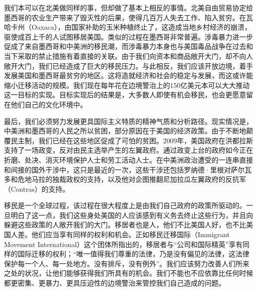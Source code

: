 \documentclass[fontset=fandol, a4paper, 12pt, openright]{ctexbook}
\begin{document}
我们本可以在北美做同样的事，但却做了基本上相反的事情。北美自由贸易协定给墨西哥的农业生产带来了毁灭性的后果，使得几百万人失去工作、陷入贫穷。在瓦哈卡州（Oaxaca），由国家补助的玉米种植终止了，这造成当地乡村经济的崩溃，驱使成百上千的人试图移居美国。类似的过程在墨西哥非常普遍。涉毒暴力进一步促成了来自墨西哥和中美洲的移民潮，而涉毒暴力本身也与美国毒品战争在过去和当下采取的禁止措施有着直接的关联。由于我们向资本和商品敞开大门，却不向人敞开大门，我们已经造成了巨大的移民压力。与此相反，我们应该开放边境，着手发展美国和墨西哥最贫穷的地区。这将造就经济和社会的稳定与发展，而这或许能缩小迁移活动的规模。我们现在每年花在边境警治上的150亿美元本可以大大推动这一目标的实现。目标实现后的结果是，大多数人即使有机会移民，也会更愿意留在他们自己的文化环境中。

最后，我们必须努力发展更具国际主义特质的精神气质和分析路径。现实情况是，中美洲和墨西哥的人民之所以贫困，部分原因在于美国的经济政策。由于不断地颠覆民主制，我们已经在这些地区促成了可怕的贫困。2009年，美国政府在洪都拉斯支持了一场政变，反对由民主选举产生的左翼政府。通过政变上台的政府如今正在折磨、处决、消灭环境保护人士和劳工活动人士。在中美洲政治遭受的一连串直接和间接的国外干涉中，这只是最近的一次，这些干涉还包括罗纳德·里根对萨尔瓦多和危地马拉的独裁政权的支持，以及他对企图推翻尼加拉瓜左翼政府的反抗军（Contras）的支持。

移民是一个全球过程，该过程在很大程度上是由我们自己政府的政策所驱动的。一旦明白了这一点，我们这些身处美国的人应该感到有义务去终止这些行为，并且向躲避这些政策的人敞开我们的大门。移居者也是人，他们不比美国人好，也不比美国人差。他们应当享有同样的权利和机会。正如移民迁移国际（Immigrant Movement International）这个团体所指出的，移居者与“公司和国际精英”享有同样的国际迁移的权利；“唯一值得我们尊重的法律，乃是没有偏见的法律，这法律保护每一个人、每一处地方。没有排斥，没有例外”。我们应该努力改善人们所来之处的状况，让他们能够获得我们所具有的机会。我们不能也不应依靠比任何时候都更密集、更暴力、更具压迫性的边境警治来管控我们自己造成的问题。
\end{document}
